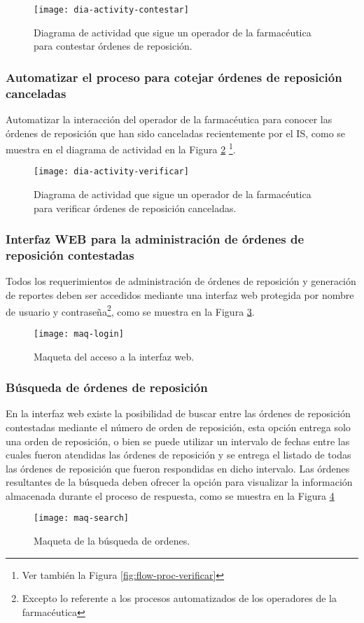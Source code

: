 \begin{figure}[h]
  \centering
  \texttt{[image: dia-activity-contestar]}
  \caption{Diagrama de actividad que sigue un operador de la farmacéutica para contestar órdenes de reposición.}
  \label{fig:dia-activity-contestar}
\end{figure}

\subsubsection{Automatizar el proceso para cotejar órdenes de reposición canceladas}
Automatizar la interacción del operador de la farmacéutica para conocer las órdenes de reposición que han sido canceladas recientemente por el IS, como se muestra en el diagrama de actividad en la Figura \ref{fig:dia-activity-verificar} \footnote{
Ver también la Figura \ref{fig:flow-proc-verificar}}.
\begin{figure}[h]
  \centering
  \texttt{[image: dia-activity-verificar]}
  \caption{Diagrama de actividad que sigue un operador de la farmacéutica para verificar órdenes de reposición canceladas.}
  \label{fig:dia-activity-verificar}
\end{figure}

\subsubsection{Interfaz WEB para la administración de órdenes de reposición contestadas}
Todos los requerimientos de administración de órdenes de reposición y generación de reportes deben ser accedidos mediante una interfaz web protegida por nombre de usuario y contraseña\footnote{Excepto lo referente a los procesos automatizados de los operadores de la farmacéutica}, como se muestra en la Figura \ref{fig:maq-login}.
\begin{figure}[h]
  \centering
  \texttt{[image: maq-login]} 
  \caption{Maqueta del acceso a la interfaz web.}
  \label{fig:maq-login}
\end{figure} 

\subsubsection{Búsqueda de órdenes de reposición}
En la interfaz web existe la posibilidad de buscar entre las órdenes de reposición contestadas mediante el número de orden de reposición, esta opción entrega solo una orden de reposición, o bien se puede utilizar un intervalo de fechas entre las cuales fueron atendidas las órdenes de reposición y se entrega el listado de todas las órdenes de reposición que fueron respondidas en dicho intervalo. Las órdenes resultantes de la búsqueda deben ofrecer la opción para visualizar la información almacenada durante el proceso de respuesta, como se muestra en la Figura \ref{fig:maq-search}
\begin{figure}[h]
  \centering
  \texttt{[image: maq-search]} 
  \caption{Maqueta de la búsqueda de ordenes.}
  \label{fig:maq-search}
\end{figure} 

